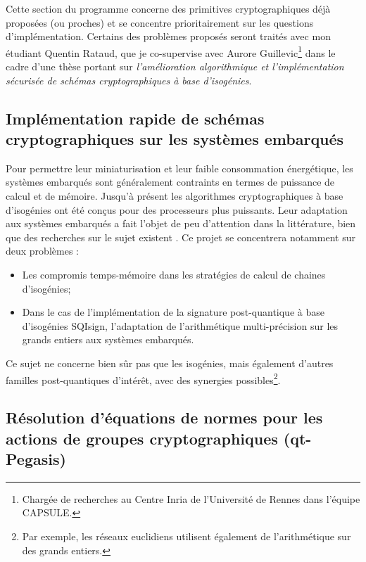 \documentclass[a4paper,10pt]{scrartcl}
\theoremstyle{definition}
\theoremstyle{plain}
\theoremstyle{definition}
\renewcommand{\(}{\left(}
\renewcommand{\)}{\right)}
\begin{document}
Cette section du programme concerne des primitives cryptographiques déjà proposées (ou proches) et se concentre prioritairement sur les questions d'implémentation. Certains des problèmes proposés seront traités avec mon étudiant Quentin Rataud, que je co-supervise avec Aurore Guillevic\footnote{Chargée de recherches au Centre Inria de l'Université de Rennes dans l'équipe CAPSULE.} dans le cadre d'une thèse portant sur \emph{l'amélioration algorithmique et l'implémentation sécurisée de schémas cryptographiques à base d'isogénies}. 

\subsection{Implémentation rapide de schémas cryptographiques sur les systèmes embarqués}

Pour permettre leur miniaturisation et leur faible consommation énergétique, les systèmes embarqués sont généralement contraints en termes de puissance de calcul et de mémoire. Jusqu'à présent les algorithmes cryptographiques à base d'isogénies ont été conçus pour des processeurs plus puissants. Leur adaptation aux systèmes embarqués a fait l'objet de peu d'attention dans la littérature, bien que des recherches sur le sujet existent \cite{SQIsign_embedded,Fast_FFM4_SQIsign}. Ce projet se concentrera notamment sur deux problèmes :
\begin{itemize}
\item Les compromis temps-mémoire dans les stratégies de calcul de chaines d'isogénies;
\item Dans le cas de l'implémentation de la signature post-quantique à base d'isogénies SQIsign, l'adaptation de l'arithmétique multi-précision sur les grands entiers aux systèmes embarqués.
\end{itemize}  
Ce sujet ne concerne bien sûr pas que les isogénies, mais également d'autres familles post-quantiques d'intérêt, avec des synergies possibles\footnote{Par exemple, les réseaux euclidiens utilisent également de l'arithmétique sur des grands entiers.}. 

\subsection{Résolution d'équations de normes pour les actions de groupes cryptographiques (qt-Pegasis)}
\end{document}
